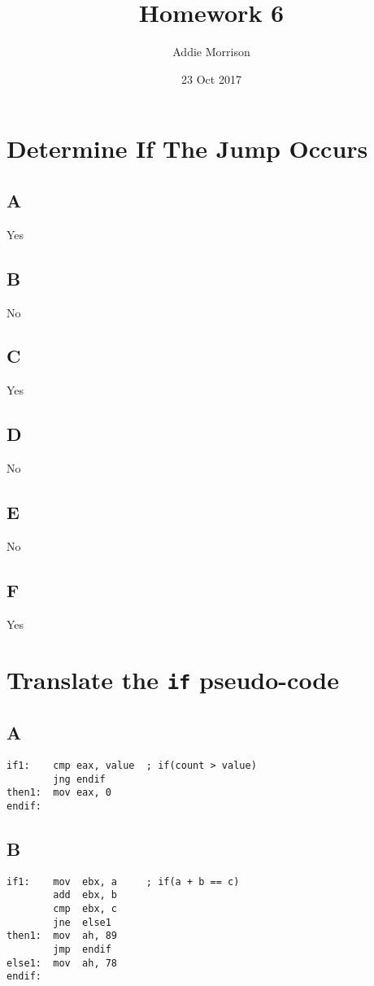 \documentclass{hitec}
\author{Addie Morrison}
\title{Homework 6}
\date{23 Oct 2017}
\begin{document}
\maketitle
\begin{minipage}{\linewidth}
\section{Determine If The Jump Occurs}
\subsection*{A}
Yes
\subsection*{B}
No
\subsection*{C}
Yes
\subsection*{D}
No
\subsection*{E}
No
\subsection*{F}
Yes
\end{minipage}
\begin{minipage}{\linewidth}
\section{Translate the \texttt{if} pseudo-code}
\subsection*{A}
\begin{verbatim}
if1:    cmp eax, value  ; if(count > value)
        jng endif
then1:  mov eax, 0
endif:
\end{verbatim}
\end{minipage}
\begin{minipage}{\linewidth}
\subsection*{B}
\begin{verbatim}
if1:    mov  ebx, a     ; if(a + b == c)
        add  ebx, b
        cmp  ebx, c
        jne  else1
then1:  mov  ah, 89
        jmp  endif
else1:  mov  ah, 78
endif:
\end{verbatim}
\end{minipage}
\end{document}
